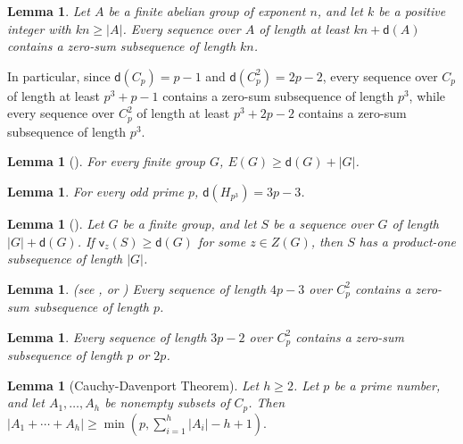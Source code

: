 \documentclass[a4paper, 12pt]{article}
\newtheorem{lemma}[theorem]{Lemma}
\theoremstyle{definition}
\begin{document}
\begin{lemma}\cite[Theorem 3.2]{GaoRestrictedII}\label{lemma:prescribed}
Let $A$ be a finite abelian group of exponent $n$, and let $k$ be a
positive integer with $kn\ge |A|$. Every sequence over $A$ of length
at least
$kn+\mathsf d(A)$
contains a zero-sum subsequence of length $kn$.
\end{lemma}

In particular, since
$\mathsf d(C_p)=p-1$ and $\mathsf d(C_p^2)=2p-2$, every sequence
over $C_p$ of length at least $p^3+p-1$ contains a zero-sum
subsequence of length $p^3$, while every sequence over $C_p^2$ of
length at least $p^3+2p-2$ contains a zero-sum subsequence of length
$p^3$.


\begin{lemma}[{\cite[Lemma 4]{ZG2005}}]\label{lemma:lowerbound}
For every finite group $G$,
$E(G)\ge \mathsf d(G)+|G|$.
\end{lemma}

\begin{lemma}{\cite[Theorem 6.2]{Volkmann}}\label{lemma:dG}
For every odd prime $p$,
$\mathsf d(H_{p^3})=3p-3$.
\end{lemma}

\begin{lemma}[{\cite[Lemma 2.9]{QuGaoLi}}]\label{lemma:center}
Let $G$ be a finite group, and let $S$ be a sequence over $G$ of
length $|G|+\mathsf d(G)$. If
$\mathsf v_z(S)\ge\mathsf d(G)$
for some $z\in Z(G)$, then $S$ has a product-one subsequence of
length $|G|$.
\end{lemma}

\begin{lemma} (see \cite{Reiher}, or \cite[Theorem 4.2.10]{GRuzsa}) \label{lemma:ranktwoEGZ}
Every sequence of length $4p-3$ over $C_p^2$ contains a zero-sum
subsequence of length $p$.
\end{lemma}

\begin{lemma}\cite[Theorem~6.7(2)]{GaoGeroldingersurvey}\label{lemma:ranktwoshort}
Every sequence of length $3p-2$ over $C_p^2$ contains a zero-sum
subsequence of length $p$ or $2p$.
\end{lemma}

\begin{lemma}[Cauchy-Davenport Theorem]\cite[Theorem 2.3]{Nathanson}\label{lemma:Cauchy-Davenport}
Let $h\ge 2$. Let $p$ be a prime number, and let $A_1,\ldots,A_h$ be nonempty subsets of
$C_p$. Then
$|A_1+\cdots+A_h|\ge
\min\left(p, \sum\limits_{i=1}^h |A_i|-h+1 \right).$
\end{lemma}
\end{document}
